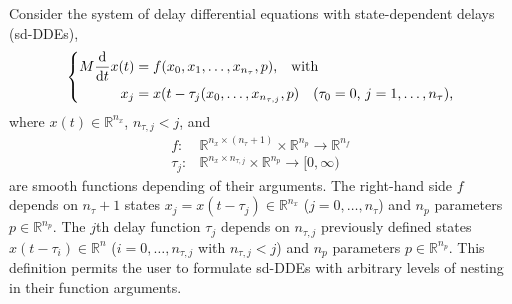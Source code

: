 \documentclass[10pt]{scrartcl}
\renewcommand{\d}{\mathrm{d}}
\newcommand{\RR}{\mathbb{R}}
\begin{document}
Consider the system of delay differential equations with
state-dependent delays (sd-DDEs),
\begin{equation}\label{the_dde_type2}
\left\{
\begin{aligned}
M\frac{\d}{\d t}{x(t)}&=f(x_0,x_1,\ldots,x_{n_\tau},p)\mbox{,\quad with}\\
x_j&=x(t-\tau_j(x_0,\ldots,x_{n_{\tau,j}},p)\quad\mbox{($\tau_0=0$, $j=1,\ldots,n_\tau$)}\mbox{,}
\end{aligned}
\right.
\end{equation}
where $x(t)\in\RR^{n_x}$, $n_{\tau,j}<j$, and
\begin{align*}
 f:&\RR^{n_x\times(n_\tau+1)}\times\RR^{n_p} \to\RR^{n_f}\\
 \tau_j:&\RR^{n_x\times n_{\tau,j}}\times\RR^{n_p}\to[0,\infty)
\end{align*}
are smooth functions depending of their arguments. The right-hand side
$f$ depends on $n_\tau+1$ states $x_j=x(t-\tau_j)\in\RR^{n_x}$
($j=0,\ldots,n_\tau$) and $n_p$ parameters $p\in\RR^{n_p}$. The $j$th
delay function $\tau_j$ depends on $n_{\tau,j}$ previously defined
states $x(t-\tau_i)\in\RR^n$ ($i=0,\ldots,n_{\tau,j}$ with
$n_{\tau,j}<j$) and $n_p$ parameters $p\in\RR^{n_p}$. This definition
permits the user to formulate sd-DDEs with arbitrary levels of nesting
in their function arguments. 
\end{document}
